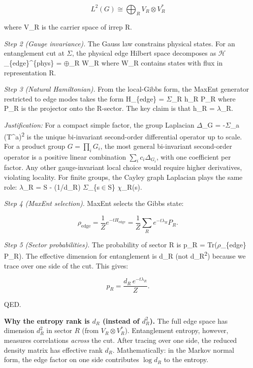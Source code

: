 \[
L^2(G) \cong \bigoplus_R V_R \otimes V_R^*
\]

where V\_R is the carrier space of irrep R.

\emph{Step 2 (Gauge invariance).} The Gauss law constrains physical states. For an entanglement cut at \ensuremath{\Sigma}, the physical edge Hilbert space decomposes as \ensuremath{\mathcal{H}}\_\{edge\}\^{}\{phys\} = \ensuremath{\oplus}\_R W\_R where W\_R contains states with flux in representation R.

\emph{Step 3 (Natural Hamiltonian).} From the local-Gibbs form, the MaxEnt generator restricted to edge modes takes the form H\_\{edge\} = \ensuremath{\Sigma}\_R h\_R P\_R where P\_R is the projector onto the R-sector. The key claim is that h\_R = \ensuremath{\lambda}\_R.

\emph{Justification:} For a compact simple factor, the group Laplacian \ensuremath{\Delta}\_G = -\ensuremath{\Sigma}\_a (T\^{}a)\textsuperscript{2} is the unique bi-invariant second-order differential operator up to scale. For a product group \(G=\prod_i G_i\), the most general bi-invariant second-order operator is a positive linear combination \(\sum_i c_i \Delta_{G_i}\), with one coefficient per factor. Any other gauge-invariant local choice would require higher derivatives, violating locality. For finite groups, the Cayley graph Laplacian plays the same role: \ensuremath{\lambda}\_R = \textbar S\textbar{} - (1/d\_R) \ensuremath{\Sigma}\_\{s\ensuremath{\in}S\} \ensuremath{\chi}\_R(s).

\emph{Step 4 (MaxEnt selection).} MaxEnt selects the Gibbs state:

\[
\rho_{\mathrm{edge}} = \frac{1}{Z} e^{-t H_{\mathrm{edge}}} = \frac{1}{Z}
\sum_R e^{-t \lambda_R} P_R.
\]

\emph{Step 5 (Sector probabilities).} The probability of sector R is p\_R = Tr(\ensuremath{\rho}\_\{edge\} P\_R). The effective dimension for entanglement is d\_R (not d\_R\textsuperscript{2}) because we trace over one side of the cut. This gives:

\[
p_R = \frac{d_R \, e^{-t \lambda_R}}{Z}.
\]

QED.

\textbf{Why the entropy rank is \(d_R\) (instead of \(d_R^2\)).} The full edge space has dimension \(d_R^2\) in sector \(R\) (from \(V_R \otimes V_R^\ast\)). Entanglement entropy, however, measures correlations \emph{across} the cut. After tracing over one side, the reduced density matrix has effective rank \(d_R\). Mathematically: in the Markov normal form, the edge factor on one side contributes \(\log d_R\) to the entropy.

